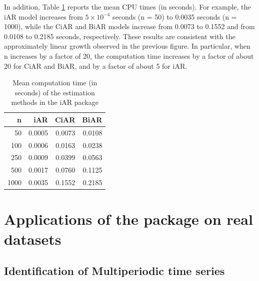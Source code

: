 In addition, Table \ref{tab:timestable} reports the mean CPU times (in seconds). For example, the iAR model increases from
\ensuremath{5\times 10^{-4}} seconds (n = 50) to 0.0035 seconds (n = 1000), while the CiAR and BiAR models increase from 0.0073 to 0.1552 and from 0.0108 to 0.2185 seconds, respectively. These results are consistent with the approximately linear growth observed in the previous figure. In particular, when n increases by a factor of 20, the computation time increases by a factor of about 20 for CiAR and BiAR, and by a factor of about 5 for iAR.

\begin{table}

\caption{\label{tab:timestable}Mean computation time (in seconds) of the estimation methods in the iAR package}
\centering
\begin{tabular}[t]{r|r|r|r}
\hline
n & iAR & CiAR & BiAR\\
\hline
50 & 0.0005 & 0.0073 & 0.0108\\
\hline
100 & 0.0006 & 0.0163 & 0.0238\\
\hline
250 & 0.0009 & 0.0399 & 0.0563\\
\hline
500 & 0.0017 & 0.0760 & 0.1125\\
\hline
1000 & 0.0035 & 0.1552 & 0.2185\\
\hline
\end{tabular}
\end{table}

\section{\texorpdfstring{Applications of the  package on real datasets}{Applications of the  package on real datasets}}\label{sec:applications}

\subsection{Identification of Multiperiodic time series}\label{identification-of-multiperiodic-time-series}


